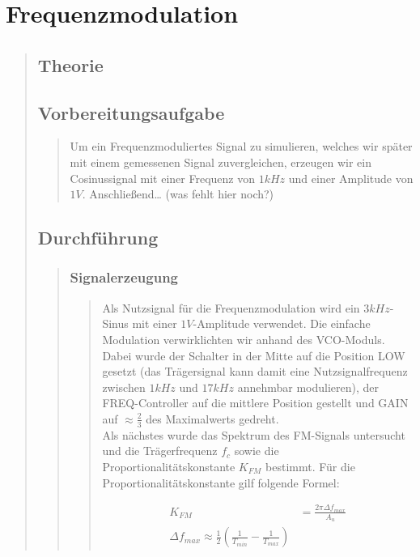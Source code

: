 \section{Frequenzmodulation}
\begin{quote}
    \subsection{Theorie}
    \begin{quote}
    \end{quote}
    
    \subsection{Vorbereitungsaufgabe}
    \begin{quote}
        Um ein Frequenzmoduliertes Signal zu simulieren, welches wir später mit einem gemessenen Signal zuvergleichen,
        erzeugen wir ein Cosinussignal mit einer Frequenz von $1kHz$ und einer
        Amplitude von $1V$. Anschließend\ldots
        (was fehlt hier noch?)
    \end{quote}
    
    \subsection{Durchführung}
    \begin{quote}
        \subsubsection{Signalerzeugung}
        \begin{quote}
        Als Nutzsignal für die Frequenzmodulation wird ein $3 kHz$-Sinus mit
        einer $1 V$-Amplitude verwendet. Die einfache Modulation verwirklichten
        wir anhand des VCO-Moduls. Dabei wurde der Schalter in der Mitte auf
        die Position LOW gesetzt (das Trägersignal kann damit eine
        Nutzsignalfrequenz zwischen $1 kHz$ und $17 kHz$ annehmbar modulieren),
        der FREQ-Controller auf die mittlere Position gestellt und GAIN auf
        $\approx \frac{2}{3}$ des Maximalwerts gedreht.\\
        Als nächstes wurde das Spektrum des FM-Signals untersucht und die
        Trägerfrequenz $f_c$ sowie die Proportionalitätskonstante $K_{FM}$
        bestimmt. Für die Proportionalitätskonstante gilf folgende Formel:
        
        \begin{equation*}
    	\begin{split}
    		K_{FM} &= \frac{2 \pi \Delta f_{max}}{A_u}\\
			\Delta f_{max} \approx \frac{1}{2} (\frac{1}{T_{min}} - \frac{1}{T_{max}})    		
    	\end{split}
    	\end{equation*}
    	

\end{quote}
\end{quote}
\end{quote}
